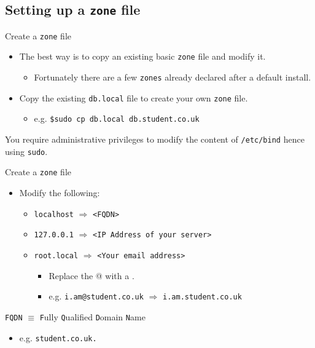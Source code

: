 \documentclass[xcolor=table]{beamer}
\begin{document}
\subsection{Setting up a \texttt{zone} file}
\begin{frame}{Create a \texttt{zone} file}
  \begin{itemize}
    \item The best way is to copy an existing basic \texttt{zone} file and modify it.
      \begin{itemize}
        \item Fortunately there are a few \texttt{zones} already declared after a default install.
      \end{itemize}
  \item Copy the existing \texttt{db.local} file to create your own \texttt{zone} file.
    \begin{itemize}
      \item e.g. \texttt{\$sudo cp db.local db.student.co.uk}
    \end{itemize}
  \end{itemize}
  \begin{tcolorbox}[title={\textbf{NOTE:}}]
    You require administrative privileges to modify the content of \texttt{/etc/bind} hence using \texttt{sudo}.
  \end{tcolorbox}
\end{frame}

\begin{frame}{Create a \texttt{zone} file}
  \begin{itemize}
    \item Modify the following:
      \begin{itemize}
        \item \texttt{localhost} $\Longrightarrow$ \texttt{<FQDN>}
        \item \texttt{127.0.0.1} $\Longrightarrow$ \texttt{<IP Address of your server>}
        \item \texttt{root.local} $\Longrightarrow$ \texttt{<Your email address>}
          \begin{itemize}
            \item Replace the @ with a . 
            \item e.g. \texttt{i.am@student.co.uk} $\Longrightarrow$ \texttt{i.am.student.co.uk}
          \end{itemize}
      \end{itemize}
  \end{itemize}
  \begin{tcolorbox}[title={\textbf{NOTE:}}]
    \texttt{FQDN} $\equiv$ \texttt{F}ully \texttt{Q}ualified \texttt{D}omain \texttt{N}ame
    \begin{itemize}
      \item e.g. \texttt{student.co.uk.}
    \end{itemize}
  \end{tcolorbox}
\end{frame}
\end{document}
